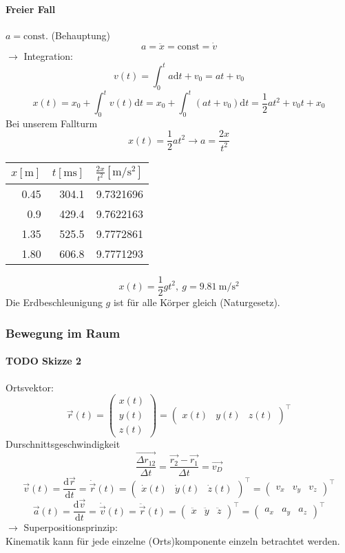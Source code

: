 \documentclass[a4paper]{scrartcl}
\begin{document}
\paragraph{Freier Fall}
\label{sec-7-1-1-4}
$a = \text{const.}$ (Behauptung)
\[a=\ddot{x} = \text{const} = \dot{v}\]
$\rightarrow$ Integration: \[v(t) = \int_0^t a\mathrm{d}t + v_0 = a t + v_0\]
\[x(t) = x_0 + \int_0^t v(t)\mathrm{d}t = x_0 + \int_0^t (a t + v_0)\mathrm{d}t = \frac{1}{2}a t^2 + v_0 t + x_0\]
Bei unserem Fallturm
\[x(t) = \frac{1}{2}a t^2 \rightarrow a = \frac{2 x}{t^2}\]
\begin{center}
\begin{tabular}{rrr}
$x[\si{\meter}]$ & $t[\si{\milli\second}]$ & $\frac{2x}{t^2}[\si{\meter\per\square\second}]$\\
\hline
0.45 & 304.1 & 9.7321696\\
0.9 & 429.4 & 9.7622163\\
1.35 & 525.5 & 9.7772861\\
1.80 & 606.8 & 9.7771293\\
\end{tabular}
\end{center}
\[x(t) = \frac{1}{2} g t^2,~g=\SI{9.81}{\meter\per\square\second}\]
Die Erdbeschleunigung $g$ ist für alle Körper gleich (Naturgesetz).
\subsubsection{Bewegung im Raum}
\label{sec-7-1-2}
\paragraph{{\bfseries\sffamily TODO} Skizze 2}
\label{sec-7-1-2-1}
Ortsvektor:
\[\vec{r}(t) = \begin{pmatrix} x(t) \\ y(t) \\ z(t) \end{pmatrix} = {\begin{pmatrix} x(t) & y(t) & z(t)\end{pmatrix}}^\intercal\]
Durschnittsgeschwindigkeit
\[\frac{\vec{\Delta r_{12}}}{\Delta t} = \frac{\vec{r_2} - \vec{r_1}}{\Delta t} = \vec{v_D}\]
\[\vec{v}(t) = \frac{\mathrm{d}\vec{r}}{\mathrm{d}t} = \dot{\vec{r}}(t) = {\begin{pmatrix}\dot{x}(t) & \dot{y}(t) & \dot{z}(t)\end{pmatrix}}^\intercal = {\begin{pmatrix} v_x & v_y & v_z\end{pmatrix}}^\intercal\]
\[\vec{a}(t) = \frac{\mathrm{d}\vec{v}}{\mathrm{d}t} = \dot{\vec{v}}(t) = \ddot{\vec{r}}(t) = {\begin{pmatrix} \ddot{x} & \ddot{y} & \ddot{z}\end{pmatrix}}^\intercal = {\begin{pmatrix} a_x & a_y & a_z \end{pmatrix}}^\intercal\]
$\rightarrow$ Superpositionsprinzip: \\
    Kinematik kann für jede einzelne (Orts)komponente einzeln betrachtet werden.
\end{document}
